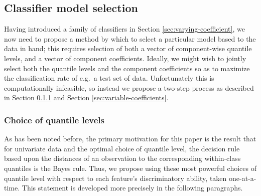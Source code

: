 \subsection{Classifier model selection}
\label{sec:model-selection}

Having introduced a family of classifiers in Section
\ref{sec:varying-coefficient}, we now need to propose a method by which to
select a particular model based to the data in hand; this requires selection of
both a vector of component-wise quantile levels, and a vector of component
coefficients.  Ideally, we might wish to jointly select both the quantile levels
and the component coefficients so as to maximize the classification rate of
e.g.\ a test set of data.  Unfortunately this is computationally infeasible, so
instead we propose a two-step process as described in Section
\ref{sec:choice-of-quantile-lev} and Section \ref{sec:variable-coefficients}.




\subsubsection{Choice of quantile levels}
\label{sec:choice-of-quantile-lev}

As has been noted before, the primary motivation for this paper is the result
that for univariate data and the optimal choice of quantile level, the decision
rule based upon the distances of an observation to the corresponding
within-class quantiles is the Bayes rule.  Thus, we propose using these most
powerful choices of quantile level with respect to each feature's discriminatory
ability, taken one-at-a-time.  This statement is developed more precisely in the
following paragraphs.


